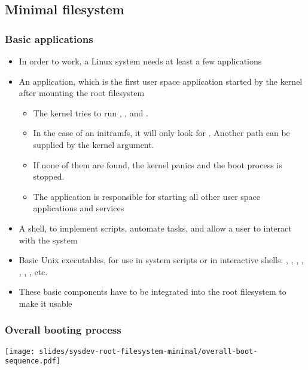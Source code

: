 \subsection{Minimal filesystem}
\begin{frame}
  \frametitle{Basic applications}
  \fontsize{10}{10}\selectfont
  \begin{itemize}
  \item In order to work, a Linux system needs at least a few
    applications
  \item An  application, which is the first user space
    application started by the kernel after mounting the root
    filesystem
    \begin{itemize}
    \item The kernel tries to run , ,
       and .
    \item In the case of an initramfs, it will only look for
      . Another path can be supplied by the 
      kernel argument.
    \item If none of them are found, the kernel panics and the boot
      process is stopped.
    \item The  application is responsible for starting all other
      user space applications and services
    \end{itemize}
  \item A shell, to implement scripts, automate tasks, and allow a user
        to interact with the system
  \item Basic Unix executables, for use in system scripts or in
        interactive shells: , , , ,
        , , , etc.
  \item These basic components have to be integrated into the root
    filesystem to make it usable
  \end{itemize}
\end{frame}

\begin{frame}
  \frametitle{Overall booting process}
  \begin{center}
    \texttt{[image: slides/sysdev-root-filesystem-minimal/overall-boot-sequence.pdf]}
  \end{center}
\end{frame}
